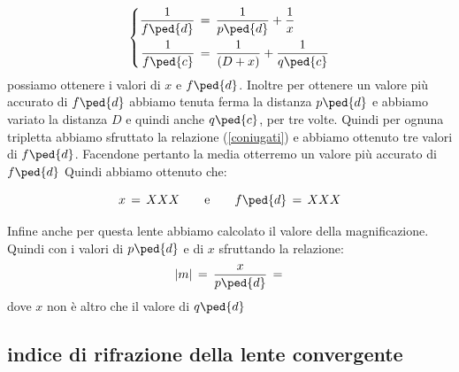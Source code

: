 \begin{equation}
 \left\{
  \begin{aligned}
    \frac{1}{f\ped{d}} & \,=\, \frac{1}{p\ped{d}} + \frac{1}{x}\\
    \frac{1}{f\ped{c}} & \,=\, \frac{1}{(D + x)} + \frac{1}{q\ped{c}}
  \end{aligned}
\right.
\end{equation}
%
possiamo ottenere i valori di $x$ e $f\ped{d}$. Inoltre per ottenere un valore più accurato di $f\ped{d}$ abbiamo tenuta ferma la distanza $p\ped{d}$ e abbiamo variato la distanza $D$ e quindi anche $q\ped{c}$, per tre volte. Quindi per ognuna tripletta abbiamo sfruttato la relazione (\ref{coniugati}) e abbiamo ottenuto tre valori di $f\ped{d}$. Facendone pertanto la media otterremo un valore più accurato di $f\ped{d}$
Quindi abbiamo ottenuto che:

\begin{equation}
	x \,=\, XXX \qquad \text{e} \qquad f\ped{d} \,=\, XXX
\end{equation}

Infine anche per questa lente abbiamo calcolato il valore della magnificazione. Quindi con i valori di $p\ped{d}$ e di $x$ sfruttando la relazione:
\begin{equation}
	|m| \,=\, \frac{x}{p\ped{d}} \,=\,
\end{equation}
dove $x$ non è altro che il valore di $q\ped{d}$

\subsection{indice di rifrazione della lente convergente}

